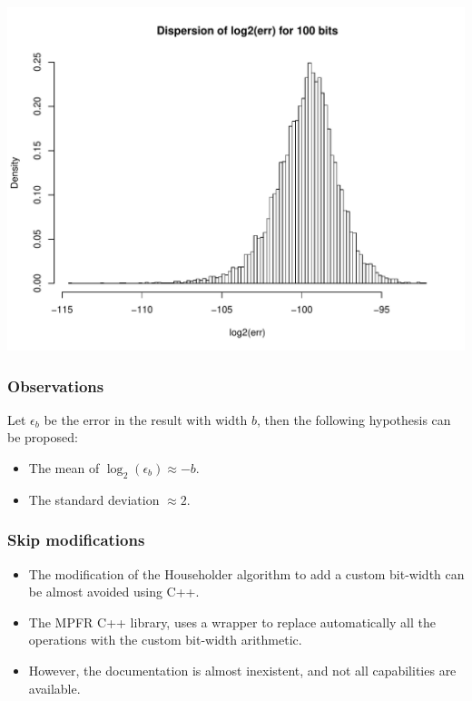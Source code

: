 \documentclass[serif, 12pt]{beamer}
\begin{document}

\begin{frame}

\begin{adjustwidth}{-2em}{-2em}
\centering
\includegraphics[width=\linewidth]{../../src/err100.pdf}
\end{adjustwidth}

\end{frame}


\begin{frame}
\frametitle{Observations}
Let $\epsilon_b$ be the error in the result with width $b$, then the following 
hypothesis can be proposed:
\begin{itemize}
\item The mean of $\log_2(\epsilon_b) \approx -b$.
\item The standard deviation $\approx 2$.
\end{itemize}

\end{frame}


\begin{frame}
\frametitle{Skip modifications}

\begin{itemize}
\item The modification of the Householder algorithm to add a custom bit-width 
can be almost avoided using C++.

\item The MPFR C++ library, uses a wrapper to replace automatically all the 
operations with the custom bit-width arithmetic.

\item However, the documentation is almost inexistent, and not all capabilities 
are available.
\end{itemize}
\end{frame}
\end{document}
